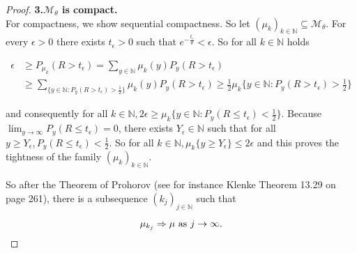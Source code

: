 \documentclass[12pt,a4paper]{scrartcl}
\numberwithin{equation}{section}
\newcommand{\N}{\mathbb{N}} %
\begin{document}
\begin{proof}
\textbf{3.$\mathcal{M}_{\theta}$ is compact.}\\

For compactness, we show sequential compactness. So let $ \left(\mu_k\right)_{k \in \N} \subseteq \mathcal{M}_{\theta} $. For every $\epsilon > 0$ there exists $t_{\epsilon} > 0$ such that $e^{-\frac{t_{\epsilon}}{\theta}} < \epsilon.$ So for all $k \in \N$ holds 

\begin{align*}
\epsilon &\geq P_{\mu_k}\left(R > t_{\epsilon}\right) = \sum_{y \in \N} \mu_k\left(y\right) P_y\left(R > t_{\epsilon}\right) \\
&\geq \sum_{\lbrace y \in \N : P_y\left(R > t_{\epsilon}\right) > \frac{1}{2}\rbrace } \mu_k\left(y\right) P_y\left(R > t_{\epsilon}\right) \geq \frac{1}{2} \mu_k\lbrace y \in \N : P_y\left(R > t_{\epsilon}\right) > \frac{1}{2}\rbrace 
\end{align*}

and consequently for all $k \in \N, 2\epsilon \geq \mu_k\lbrace y \in \N : P_y\left(R \leq t_{\epsilon}\right) < \frac{1}{2}\rbrace $. Because $\lim_{y \to \infty} P_y\left(R \leq t_{\epsilon}\right) = 0$, there exists $Y_{\epsilon} \in \N$ such that for all $ y \geq Y_{\epsilon}, P_y\left(R \leq t_{\epsilon}\right) < \frac{1}{2}$. So for all $ k \in \N, \mu_k\lbrace y \geq Y_{\epsilon} \rbrace  \leq 2 \epsilon $ and this proves the tightness of the family $\left(\mu_k\right)_{k \in \N}.$

So after the Theorem of Prohorov (see for instance Klenke \cite{klenke} Theorem 13.29 on page 261),  there is a subsequence $\left(k_j\right)_{j \in \N}$ such that 

$$ \mu_{k_j} \Rightarrow \mu \textnormal{ as } j \to \infty.$$


\end{proof}
\end{document}
